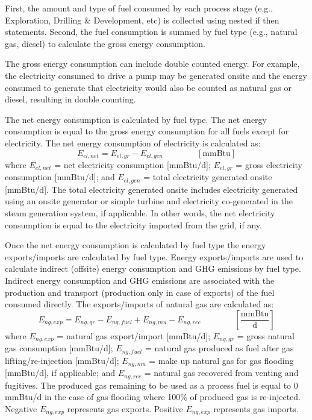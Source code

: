 \documentclass[11pt]{report}
\newcommand{\eqnunit}[1]{\quad\quad \scriptstyle{\left[\text{#1}\right]}}
\newcommand{\eqnunitfrac}[2]{\quad\quad \scriptstyle{\left[\frac{\text{#1}}{\text{#2}}\right]}}
\begin{document}
First, the amount and type of fuel consumed by each process stage (e.g., Exploration, Drilling \& Development, etc) is collected using nested if then statements. Second, the fuel consumption is summed by fuel type (e.g., natural gas, diesel) to calculate the gross energy consumption. 

The gross energy consumption can include double counted energy. For example, the electricity consumed to drive a pump may be generated onsite and the energy consumed to generate that electricity would also be counted as natural gas or diesel, resulting in double counting. 

The net energy consumption is calculated by  fuel type. The net energy consumption is equal to the gross energy consumption for all fuels except for electricity. The net energy consumption of electricity is calculated as:
\begin{equation}\label{net_elec}
E_{el,net}= E_{el,gr} - E_{el,gen} \quad\quad\eqnunit{mmBtu}
\end{equation}
where $ E_{el,net}$ = net electricity consumption [mmBtu/d]; $E_{el,gr}$ = gross electricity consumption [mmBtu/d]; and $E_{el,gen}$ = total electricity generated onsite [mmBtu/d]. The total electricity generated onsite includes electricity generated using an onsite generator or simple turbine and electricity co-generated in the steam generation system, if applicable. In other words, the net electricity consumption is equal to the electricity imported from the grid, if any.

Once the  net energy consumption is calculated by fuel type the energy exports/imports are calculated by fuel type. Energy exports/imports are used to calculate indirect (offsite) energy consumption and GHG emissions by fuel type. Indirect energy consumption and GHG emissions are associated with the production and transport (production only in case of exports) of the fuel consumed directly. The exports/imports of natural gas are calculated as: 
\begin{equation}
E_{ng,exp} = E_{ng,gr} - E_{ng,fuel} + E_{ng,mu} - E_{ng,rec} \quad\quad\eqnunitfrac{mmBtu}{d}
\end{equation}
where $E_{ng,exp}$ = natural gas export/import [mmBtu/d]; $E_{ng,gr}$ = gross natural gas consumption [mmBtu/d]; $E_{ng,fuel}$ = natural gas produced as fuel after gas lifting/re-injection [mmBtu/d]; $E_{ng,mu}$ = make up natural gas for gas flooding [mmBtu/d], if applicable; and $E_{ng,rec}$ = natural gas recovered from venting and fugitives. The produced gas remaining to be used as a process fuel is equal to 0 mmBtu/d in the case of gas flooding where 100\% of produced gas is re-injected. Negative $E_{ng,exp}$ represents gas exports. Positive $E_{ng,exp}$ represents gas imports.
\end{document}
